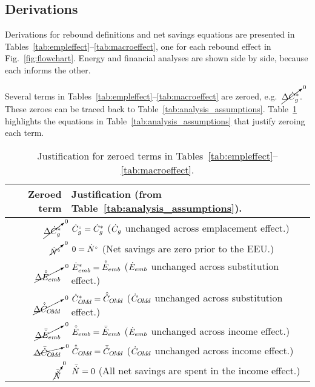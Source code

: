 


\subsection{Derivations}
\label{sec:derivations}

Derivations for rebound definitions and net savings equations
are presented in Tables~\ref{tab:empleffect}--\ref{tab:macroeffect},
one for each rebound effect in Fig.~\ref{fig:flowchart}.
Energy and financial analyses are shown side by side, because
each informs the other.

Several terms in Tables~\ref{tab:empleffect}--\ref{tab:macroeffect}
are zeroed, e.g.\ $\cancelto{0}{\Delta {\dot{C}}^*_g}$. 
These zeroes can be traced back to Table~\ref{tab:analysis_assumptions}.
Table~\ref{tab:zeroed_terms} highlights the equations
in Table~\ref{tab:analysis_assumptions}
that justify zeroing each term.

\begin{table}
\footnotesize
\centering %
\caption{Justification for zeroed terms in Tables~\ref{tab:empleffect}--\ref{tab:macroeffect}.}
\begin{tabular}{r l}
  \toprule
  Zeroed term & Justification (from Table~\ref{tab:analysis_assumptions}). \\
  \midrule
  $\cancelto{0}{\Delta {\dot{C}}^*_g}$    & ${}{\dot{C}}^{\scriptscriptstyle \circ}_g = {\dot{C}}^*_g$ ($\dot{C}_g$ unchanged across emplacement effect.) \\
  $\cancelto{0}{{}{\dot{N}}^{\scriptscriptstyle \circ}}$              & $0 = {}{\dot{N}}^{\scriptscriptstyle \circ}$ (Net savings are zero prior to the EEU.) \\
  $\cancelto{0}{\Delta \hat{\dot{E}}_{emb}}$ & ${\dot{E}}^*_{emb} = \hat{\dot{E}}_{emb}$ ($\dot{E}_{emb}$ unchanged across substitution effect.) \\
  $\cancelto{0}{\Delta \hat{\dot{C}}_{O\!M\!d}}$ & ${\dot{C}}^*_{O\!M\!d} = \hat{\dot{C}}_{O\!M\!d}$ ($\dot{C}_{O\!M\!d}$ unchanged across substitution effect.) \\
  $\cancelto{0}{\Delta \bar{\dot{E}}_{emb}}$ & $\hat{\dot{E}}_{emb} = \bar{\dot{E}}_{emb}$ ($\dot{E}_{emb}$ unchanged across income effect.) \\
  $\cancelto{0}{\Delta \bar{\dot{C}}_{O\!M\!d}}$ & $\hat{\dot{C}}_{O\!M\!d} = \bar{\dot{C}}_{O\!M\!d}$ ($\dot{C}_{O\!M\!d}$ unchanged across income effect.) \\
  $\cancelto{0}{\bar{\dot{N}}}$              & $\bar{\dot{N}} = 0$ (All net savings are spent in the income effect.) \\
  \bottomrule
\end{tabular}
\label{tab:zeroed_terms}
\end{table}




